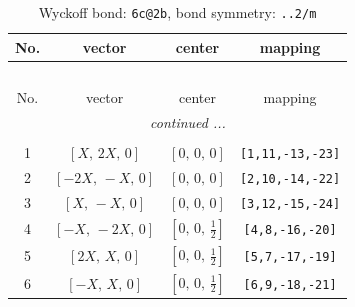 \documentclass[fleqn,8pt]{jsarticle}
\begin{document}
\begin{longtable}{cccc}
\caption{Wyckoff bond: {\tt 6c@2b}, bond symmetry: {\tt ..2/m}}
 \\
 \hline \hline
No. & vector & center & mapping \\ \hline \endfirsthead

\multicolumn{3}{l}{\tablename\ \thetable{}} \\
 \hline \hline
No. & vector & center & mapping \\ \hline \endhead

 \hline \hline
\multicolumn{3}{r}{\footnotesize\it continued ...} \\ \endfoot

 \hline \hline
\multicolumn{3}{r}{} \\ \endlastfoot

1 & $\left[ X,\, 2 X,\, 0 \right]$ & $\left[ 0,\, 0,\, 0 \right]$ & {\tt [1,11,-13,-23]} \\ \hline
2 & $\left[ - 2 X,\, - X,\, 0 \right]$ & $\left[ 0,\, 0,\, 0 \right]$ & {\tt [2,10,-14,-22]} \\ \hline
3 & $\left[ X,\, - X,\, 0 \right]$ & $\left[ 0,\, 0,\, 0 \right]$ & {\tt [3,12,-15,-24]} \\ \hline
4 & $\left[ - X,\, - 2 X,\, 0 \right]$ & $\left[ 0,\, 0,\, \frac{1}{2} \right]$ & {\tt [4,8,-16,-20]} \\ \hline
5 & $\left[ 2 X,\, X,\, 0 \right]$ & $\left[ 0,\, 0,\, \frac{1}{2} \right]$ & {\tt [5,7,-17,-19]} \\ \hline
6 & $\left[ - X,\, X,\, 0 \right]$ & $\left[ 0,\, 0,\, \frac{1}{2} \right]$ & {\tt [6,9,-18,-21]} \\
\end{longtable}
\renewcommand{\arraystretch}{1.2}
\end{document}
